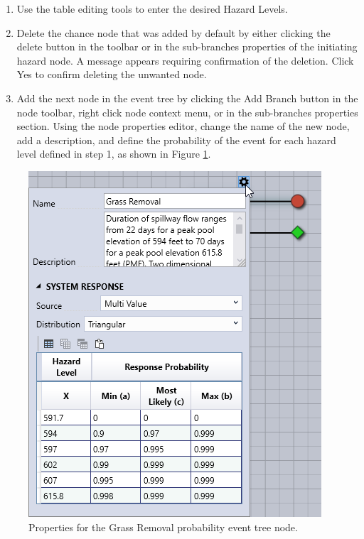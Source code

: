 \documentclass[
]{book}
\begin{document}
\begin{enumerate}
\def\labelenumi{\arabic{enumi}.}
\setcounter{enumi}{1}
\item
  Use the table editing tools to enter the desired Hazard Levels.
\item
  Delete the chance node that was added by default by either clicking the delete button in the toolbar or in the sub-branches properties of the initiating hazard node. A message appears requiring confirmation of the deletion. Click Yes to confirm deleting the unwanted node.
\item
  Add the next node in the event tree by clicking the Add Branch button in the node toolbar, right click node context menu, or in the sub-branches properties section. Using the node properties editor, change the name of the new node, add a description, and define the probability of the event for each hazard level defined in step 1, as shown in Figure \ref{fig:figure-90}.
\end{enumerate}

\begin{figure}

{\centering \includegraphics{images/figure90} 

}

\caption{Properties for the Grass Removal probability event tree node.}\label{fig:figure-90}
\end{figure}
\end{document}
